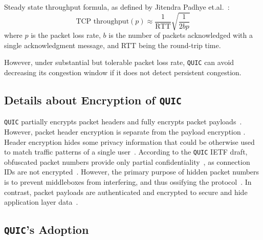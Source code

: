 \documentclass[12pt,a4paper,twoside,openright]{report}
\newcommand\note[2]{{\color{#1}\bf #2}}
\newcommand\simon[1]{\ifcomments{\note{cyan}{SM: #1}}\fi}
\begin{document}
\begin{itemize}
  Steady state throughput formula, as defined by Jitendra Padhye et.al.~\cite{TCP_throughput_formula}: 
    \begin{equation}
    \textrm{TCP throughput} (p) \approx \frac{1}{\textrm{RTT}}\sqrt{\frac{1}{2bp}} 
    \label{eq:gass_stuff}
    \end{equation}
     where $p$ is the packet loss rate, $b$ is the number of packets acknowledged with a single acknowledgment message, and RTT being the round-trip time.
  
  
  However, under substantial but tolerable packet loss rate, \texttt{QUIC} can avoid decreasing its congestion window if it does not detect persistent congestion.
  
  
\end{itemize}



\subsection{Details about Encryption of \texttt{QUIC}} \label{subsection_QUIC_header_format}


\texttt{QUIC} partially encrypts packet headers and fully encrypts packet payloads~\cite{the-road-to-quic}.
However, packet header encryption is separate from the payload encryption
\simon{TODO: FIND SOURCE}.
Header encryption hides some privacy information that could be otherwise used to match traffic patterns of a single user~\cite{2017-12-18-transport-header-encryption, the-road-to-quic}.
According to the \texttt{QUIC} IETF draft, obfuscated packet numbers provide only partial confidentiality~\cite{ietf-quic-transport-draft-32}, as connection IDs are not encrypted~\cite[Section~5.4.1]{ietf-quic-tls-32}.
However, the primary purpose of hidden packet numbers is to prevent middleboxes from interfering, and thus ossifying the protocol~\cite{the-road-to-quic}.
In contrast, packet payloads are authenticated and encrypted to secure and hide application layer data~\cite{ietf-quic-tls-32}.

  
  
\subsection{\texttt{QUIC}'s Adoption}
\end{document}
